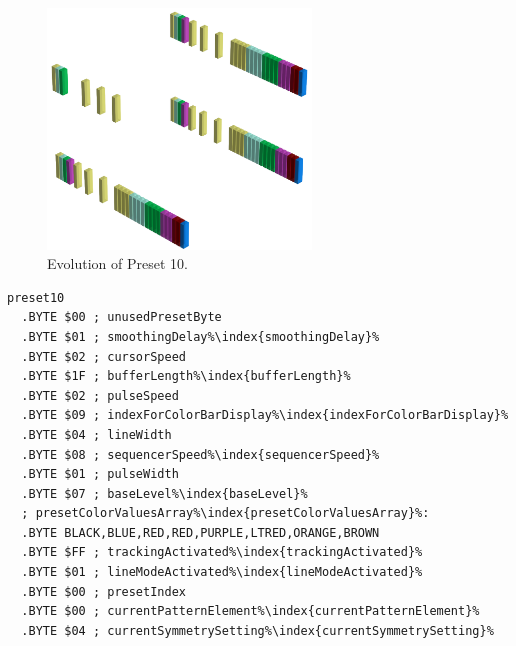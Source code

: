 \vspace*{-0.7cm}
\begin{minipage}[b]{0.48\linewidth}


                                                                 
\begin{figure}[H]                                                          
  \centering                                                             
  \begin{adjustbox}{width=7cm,center}                                   
  \includegraphics[width=7cm]{src/presets/pattern10-45.png}%
  \end{adjustbox}                                                        
\caption{Evolution of Preset 10.}                                           
\end{figure}                                                               
                                                                 
                                                                           
\end{minipage}
\hspace{0.1cm}
\begin{minipage}[b]{0.48\linewidth}                                       
\begin{lstlisting}[basicstyle=\ttfamily\scriptsize,caption=Data structure for Preset 10.,escapechar=\%]
preset10
  .BYTE $00 ; unusedPresetByte
  .BYTE $01 ; smoothingDelay%\index{smoothingDelay}%
  .BYTE $02 ; cursorSpeed
  .BYTE $1F ; bufferLength%\index{bufferLength}%
  .BYTE $02 ; pulseSpeed
  .BYTE $09 ; indexForColorBarDisplay%\index{indexForColorBarDisplay}%
  .BYTE $04 ; lineWidth
  .BYTE $08 ; sequencerSpeed%\index{sequencerSpeed}%
  .BYTE $01 ; pulseWidth
  .BYTE $07 ; baseLevel%\index{baseLevel}%
  ; presetColorValuesArray%\index{presetColorValuesArray}%: 
  .BYTE BLACK,BLUE,RED,RED,PURPLE,LTRED,ORANGE,BROWN
  .BYTE $FF ; trackingActivated%\index{trackingActivated}%
  .BYTE $01 ; lineModeActivated%\index{lineModeActivated}%
  .BYTE $00 ; presetIndex
  .BYTE $00 ; currentPatternElement%\index{currentPatternElement}%
  .BYTE $04 ; currentSymmetrySetting%\index{currentSymmetrySetting}%
\end{lstlisting}
\end{minipage}

